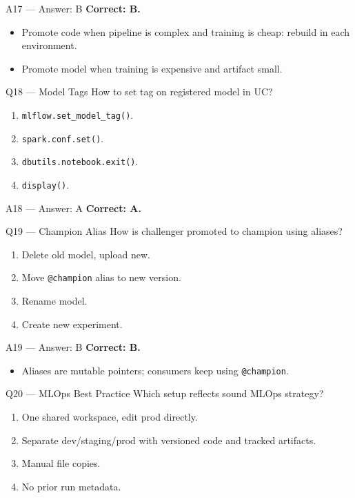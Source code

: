 \documentclass[aspectratio=169,9pt]{beamer}
\begin{document}
	\begin{frame}{A17 — Answer: B}
		\textbf{Correct: B.}
		\begin{itemize}
			\item Promote code when pipeline is complex and training is cheap: rebuild in each environment.
			\item Promote model when training is expensive and artifact small.
		\end{itemize}
	\end{frame}
	
	\begin{frame}{Q18 — Model Tags}
		How to set tag on registered model in UC?
		\begin{enumerate}[label=\Alph*.]
			\item \texttt{mlflow.set\_model\_tag()}.
			\item \texttt{spark.conf.set()}.
			\item \texttt{dbutils.notebook.exit()}.
			\item \texttt{display()}.
		\end{enumerate}
	\end{frame}
	
	\begin{frame}{A18 — Answer: A}
		\textbf{Correct: A.}
	\end{frame}
	
	\begin{frame}{Q19 — Champion Alias}
		How is challenger promoted to champion using aliases?
		\begin{enumerate}[label=\Alph*.]
			\item Delete old model, upload new.
			\item Move \texttt{@champion} alias to new version.
			\item Rename model.
			\item Create new experiment.
		\end{enumerate}
	\end{frame}
	
	\begin{frame}{A19 — Answer: B}
		\textbf{Correct: B.}
		\begin{itemize}
			\item Aliases are mutable pointers; consumers keep using \texttt{@champion}.
		\end{itemize}
	\end{frame}
	
	\begin{frame}{Q20 — MLOps Best Practice}
		Which setup reflects sound MLOps strategy?
		\begin{enumerate}[label=\Alph*.]
			\item One shared workspace, edit prod directly.
			\item Separate dev/staging/prod with versioned code and tracked artifacts.
			\item Manual file copies.
			\item No prior run metadata.
		\end{enumerate}
	\end{frame}
	
\end{document}
